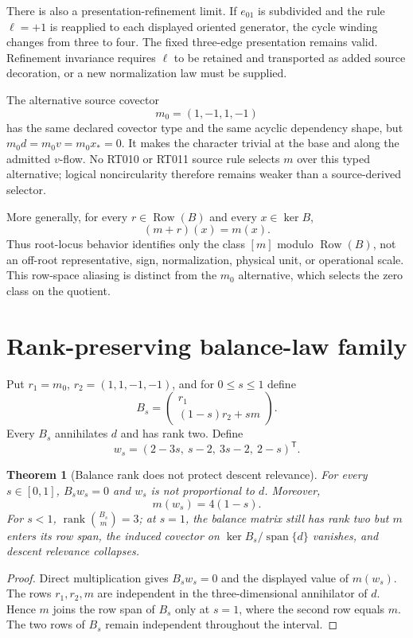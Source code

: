 \documentclass[11pt]{article}
\newtheorem{theorem}{Theorem}
\begin{document}
There is also a presentation-refinement limit.  If $e_{01}$ is subdivided and
the rule $\ell=+1$ is reapplied to each displayed oriented generator, the cycle
winding changes from three to four.  The fixed three-edge presentation remains
valid.  Refinement invariance requires $\ell$ to be retained and transported as
added source decoration, or a new normalization law must be supplied.

The alternative source covector
\[
 m_0=(1,-1,1,-1)
\]
has the same declared covector type and the same acyclic dependency shape, but
$m_0d=m_0v=m_0x_*=0$.  It makes the character trivial at the base and along
the admitted $v$-flow.  No RT010 or RT011 source rule selects $m$ over this
typed alternative; logical noncircularity therefore remains weaker than a
source-derived selector.

More generally, for every $r\in\operatorname{Row}(B)$ and every
$x\in\ker B$,
\[
 (m+r)(x)=m(x).
\]
Thus root-locus behavior identifies only the class $[m]$ modulo
$\operatorname{Row}(B)$, not an off-root representative, sign, normalization,
physical unit, or operational scale.  This row-space aliasing is distinct from
the $m_0$ alternative, which selects the zero class on the quotient.

\section{Rank-preserving balance-law family}

Put $r_1=m_0$, $r_2=(1,1,-1,-1)$, and for $0\le s\le1$ define
\[
 B_s=\begin{pmatrix}r_1\\(1-s)r_2+s m\end{pmatrix}.
\]
Every $B_s$ annihilates $d$ and has rank two.  Define
\[
 w_s=(2-3s,\ s-2,\ 3s-2,\ 2-s)^\mathsf T.
\]

\begin{theorem}[Balance rank does not protect descent relevance]
For every $s\in[0,1]$, $B_sw_s=0$ and $w_s$ is not proportional to $d$.
Moreover,
\[
 m(w_s)=4(1-s).
\]
For $s<1$, $\operatorname{rank}\binom{B_s}{m}=3$; at $s=1$, the balance
matrix still has rank two but $m$ enters its row span, the induced covector on
$\ker B_s/\operatorname{span}\{d\}$ vanishes, and descent relevance collapses.
\end{theorem}

\begin{proof}
Direct multiplication gives $B_sw_s=0$ and the displayed value of $m(w_s)$.
The rows $r_1,r_2,m$ are independent in the three-dimensional annihilator of
$d$.  Hence $m$ joins the row span of $B_s$ only at $s=1$, where the second row
equals $m$.  The two rows of $B_s$ remain independent throughout the interval.
\end{proof}
\end{document}
